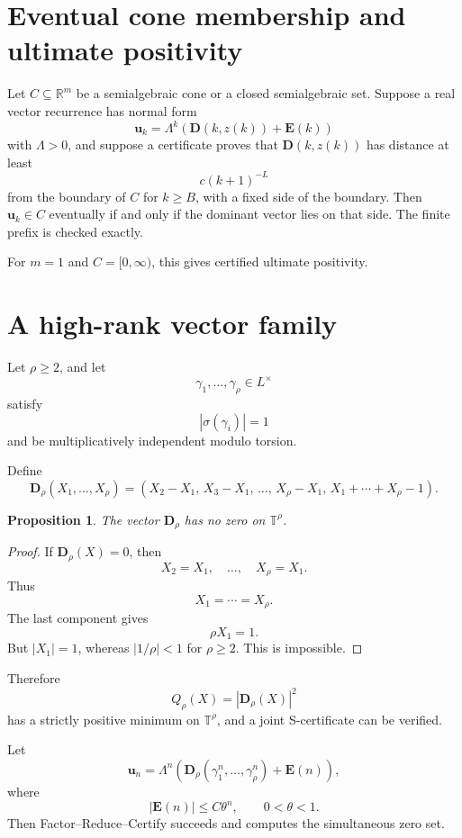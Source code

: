 \documentclass[11pt]{article}
\newtheorem{proposition}[theorem]{Proposition}
\newcommand{\T}{\mathbb T}
\newcommand{\R}{\mathbb R}
\begin{document}
\section{Eventual cone membership and ultimate positivity}

Let \(C\subseteq\R^m\) be a semialgebraic cone or a closed semialgebraic set. Suppose a real vector recurrence has normal form
\[
\mathbf u_k=\Lambda^k(\mathbf D(k,z(k))+\mathbf E(k))
\]
with \(\Lambda>0\), and suppose a certificate proves that \(\mathbf D(k,z(k))\) has distance at least
\[
c(k+1)^{-L}
\]
from the boundary of \(C\) for \(k\ge B\), with a fixed side of the boundary. Then \(\mathbf u_k\in C\) eventually if and only if the dominant vector lies on that side. The finite prefix is checked exactly.

For \(m=1\) and \(C=[0,\infty)\), this gives certified ultimate positivity.

\section{A high-rank vector family}

Let \(\rho\ge2\), and let
\[
\gamma_1,\ldots,\gamma_\rho\in L^\times
\]
satisfy
\[
|\sigma(\gamma_i)|=1
\]
and be multiplicatively independent modulo torsion.

Define
\[
\mathbf D_\rho(X_1,\ldots,X_\rho)
=
\left(
X_2-X_1,\,
X_3-X_1,\,
\ldots,\,
X_\rho-X_1,\,
X_1+\cdots+X_\rho-1
\right).
\]

\begin{proposition}
The vector \(\mathbf D_\rho\) has no zero on \(\T^\rho\).
\end{proposition}

\begin{proof}
If \(\mathbf D_\rho(X)=0\), then
\[
X_2=X_1,\quad \ldots,\quad X_\rho=X_1.
\]
Thus
\[
X_1=\cdots=X_\rho.
\]
The last component gives
\[
\rho X_1=1.
\]
But \(|X_1|=1\), whereas \(|1/\rho|<1\) for \(\rho\ge2\). This is impossible.
\end{proof}

Therefore
\[
Q_\rho(X)=|\mathbf D_\rho(X)|^2
\]
has a strictly positive minimum on \(\T^\rho\), and a joint S-certificate can be verified.

Let
\[
\mathbf u_n
=
\Lambda^n\left(\mathbf D_\rho(\gamma_1^n,\ldots,\gamma_\rho^n)+\mathbf E(n)\right),
\]
where
\[
|\mathbf E(n)|\le C\theta^n,
\qquad
0<\theta<1.
\]
Then Factor--Reduce--Certify succeeds and computes the simultaneous zero set.
\end{document}
